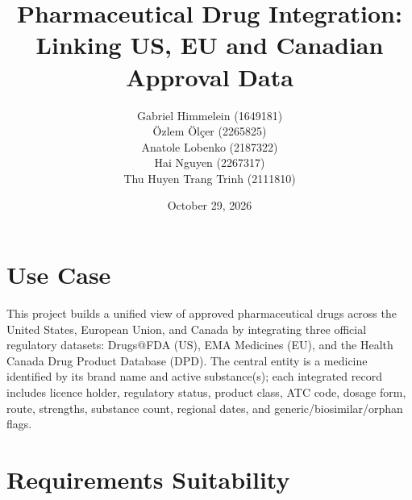 \documentclass[a4paper,oneside,bibliography=totoc]{scrbook}
\begin{document}
\makeatletter
\renewcommand\thesection{\arabic{section}}
\renewcommand\thesubsection{\arabic{section}.\arabic{subsection}}
\renewcommand\thesubsubsection{\arabic{section}.\arabic{subsection}.\arabic{subsubsection}}
\makeatother

\subject{Web Data Integration \\ Final Report}
\title{Pharmaceutical Drug Integration: Linking US, EU and Canadian Approval Data}
\author{
  Gabriel Himmelein (1649181)\\
  Özlem Ölçer (2265825)\\
  Anatole Lobenko (2187322)\\
  Hai Nguyen (2267317)\\
  Thu Huyen Trang Trinh (2111810)
} \date{October 29, 2026}
\publishers{{\small Submitted to}\\
  Data and Web Science Group\\
  Dr. Ralph Peeters\\
  Prof. Dr. Christian Bizer\\
  University of Mannheim\\}
\maketitle

\section{Use Case}

This project builds a unified view of approved pharmaceutical drugs across the United States, European Union, and Canada by integrating three official regulatory datasets: Drugs@FDA (US), EMA Medicines (EU), and the Health Canada Drug Product Database (DPD). The central entity is a medicine identified by its brand name and active substance(s); each integrated record includes licence holder, regulatory status, product class, ATC code, dosage form, route, strengths, substance count, regional dates, and generic/biosimilar/orphan flags.

\section{Requirements Suitability}
\end{document}
